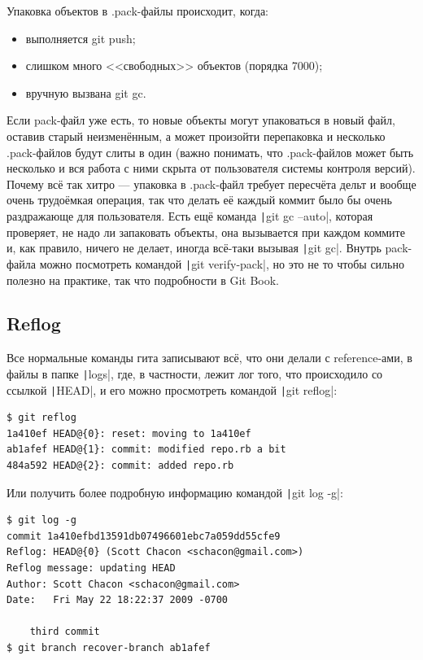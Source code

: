 \documentclass[a5paper]{article}
\begin{document}
Упаковка объектов в .pack-файлы происходит, когда:
\begin{itemize}
    \item выполняется git push;
    \item слишком много <<свободных>> объектов (порядка 7000);
    \item вручную вызвана git gc.
\end{itemize}

Если pack-файл уже есть, то новые объекты могут упаковаться в новый файл, оставив старый неизменённым, а может произойти перепаковка и несколько .pack-файлов будут слиты в один (важно понимать, что .pack-файлов может быть несколько и вся работа с ними скрыта от пользователя системы контроля версий). Почему всё так хитро --- упаковка в .pack-файл требует пересчёта дельт и вообще очень трудоёмкая операция, так что делать её каждый коммит было бы очень раздражающе для пользователя. Есть ещё команда \texttt|git gc --auto|, которая проверяет, не надо ли запаковать объекты, она вызывается при каждом коммите и, как правило, ничего не делает, иногда всё-таки вызывая \texttt|git gc|. Внутрь pack-файла можно посмотреть командой \texttt|git verify-pack|, но это не то чтобы сильно полезно на практике, так что подробности в Git Book.

\subsection{Reflog}

Все нормальные команды гита записывают всё, что они делали с reference-ами, в файлы в папке \texttt|logs|, где, в частности, лежит лог того, что происходило со ссылкой \texttt|HEAD|, и его можно просмотреть командой \texttt|git reflog|:

\begin{verbatim}
$ git reflog
1a410ef HEAD@{0}: reset: moving to 1a410ef
ab1afef HEAD@{1}: commit: modified repo.rb a bit
484a592 HEAD@{2}: commit: added repo.rb
\end{verbatim}

Или получить более подробную информацию командой \texttt|git log -g|:

\begin{verbatim}
$ git log -g
commit 1a410efbd13591db07496601ebc7a059dd55cfe9
Reflog: HEAD@{0} (Scott Chacon <schacon@gmail.com>)
Reflog message: updating HEAD
Author: Scott Chacon <schacon@gmail.com>
Date:   Fri May 22 18:22:37 2009 -0700

    third commit
$ git branch recover-branch ab1afef
\end{verbatim}
\end{document}
